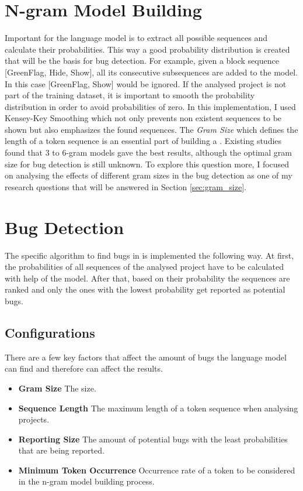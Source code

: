 \section{N-gram Model Building}\label{sec:model}
Important for the language model is to extract all possible sequences and calculate their probabilities. This way a good probability distribution is created that will be the basis for bug detection. For example, given a block sequence [GreenFlag, Hide, Show], all its consecutive subsequences are added to the model. In this case [GreenFlag, Show] would be ignored. If the analysed project is not part of the training dataset, it is important to smooth the probability distribution in order to avoid probabilities of zero. In this implementation, I used Kensey-Key Smoothing which not only prevents non existent sequences to be shown but also emphasizes the found sequences. The \emph{Gram Size} which defines the length of a token sequence is an essential part of building a \ngram{}. Existing studies found that 3 to 6-gram models gave the best results, although the optimal gram size for bug detection is still unknown. To explore this question more, I focused on analysing the effects of different gram sizes in the \scratch{} bug detection as one of my research questions that will be answered in Section \ref{sec:gram_size}.

\section{Bug Detection}\label{sec:detection}
The specific algorithm to find bugs in \scratch{} is implemented the following way. At first, the probabilities of all sequences of the analysed project have to be calculated with help of the model. After that, based on their probability the sequences are ranked and only the ones with the lowest probability get reported as potential bugs. 

\subsection{Configurations}\label{subsec:configurations}
There are a few key factors that affect the amount of bugs the language model can find and therefore can affect the results.
\begin{itemize}
\item \textbf{Gram Size} The \ngram{} size.
\item \textbf{Sequence Length} The maximum length of a token sequence when analysing \scratch{} projects. 
\item \textbf{Reporting Size} The amount of potential bugs with the least probabilities that are being reported.
\item \textbf{Minimum Token Occurrence} Occurrence rate of a token to be considered in the n-gram model building process.
\end{itemize} 
